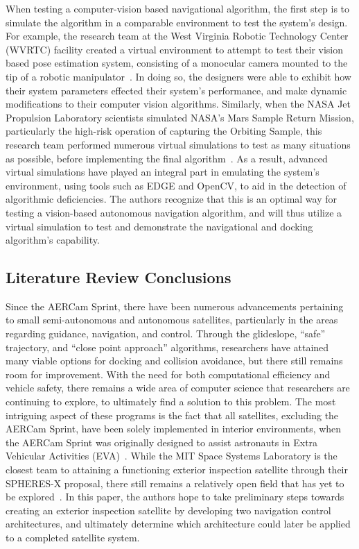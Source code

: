 \documentclass[journal, 10pt]{IEEEtran}
\begin{document}
When testing a computer-vision based navigational algorithm, the first step is to simulate the algorithm in a comparable environment to test the system's design. For example, the research team at the West Virginia Robotic Technology Center (WVRTC) facility created a virtual environment to attempt to test their vision based pose estimation system, consisting of a monocular camera mounted to the tip of a robotic manipulator~\cite{virt_sim}. In doing so, the designers were able to exhibit how their system parameters effected their system's performance, and make dynamic modifications to their computer vision algorithms. Similarly, when the NASA Jet Propulsion Laboratory scientists simulated NASA's Mars Sample Return Mission, particularly the high-risk operation of capturing the Orbiting Sample, this research team performed numerous virtual simulations to test as many situations as possible, before implementing the final algorithm~\cite{mars}. As a result, advanced virtual simulations have played an integral part in emulating the system's environment, using tools such as EDGE and OpenCV, to aid in the detection of algorithmic deficiencies. The authors recognize that this is an optimal way for testing a vision-based autonomous navigation algorithm, and will thus utilize a virtual simulation to test and demonstrate the navigational and docking algorithm's capability.

\subsection{Literature Review Conclusions}
Since the AERCam Sprint, there have been numerous advancements pertaining to small semi-autonomous and autonomous satellites, particularly in the areas regarding guidance, navigation, and control. Through the glideslope, ``safe'' trajectory, and ``close point approach'' algorithms, researchers have attained many viable options for docking and collision avoidance, but there still remains room for improvement. With the need for both computational efficiency and vehicle safety, there remains a wide area of computer science that researchers are continuing to explore, to ultimately find a solution to this problem. The most intriguing aspect of these programs is the fact that all satellites, excluding the AERCam Sprint, have been solely implemented in interior environments, when the AERCam Sprint was originally designed to assist astronauts in Extra Vehicular Activities (EVA)~\cite{Aercam, MiniAercam}. While the MIT Space Systems Laboratory is the closest team to attaining a functioning exterior inspection satellite through their SPHERES-X proposal, there still remains a relatively open field that has yet to be explored~\cite{SPHERES}. In this paper, the authors hope to take preliminary steps towards creating an exterior inspection satellite by developing two navigation control architectures, and ultimately determine which architecture could later be applied to a completed satellite system.
\end{document}
